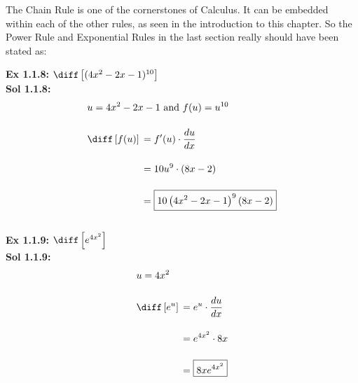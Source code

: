 The Chain Rule is one of the cornerstones of Calculus. It can be embedded within each of the other rules, as seen in the introduction to this chapter. So the Power Rule and Exponential Rules in the last section really should have been stated as: 


\textbf{Ex 1.1.8:} $\diff \left[(4x^2 - 2x - 1)^{10}\right]$ \\[11pt]
\textbf{Sol 1.1.8:} \begin{align*}
    & u = 4x^2 - 2x - 1 \text{ and } f(u) = u^{10} \\[11pt]
    & \diff \left[f(u)\right] \begin{aligned}[t]
        & = f'(u) \cdot \dfrac{du}{dx} \\[11pt] 
        & = 10u^9 \cdot \left(8x - 2\right) \\[11pt]
        & = \boxed{10\left(4x^2 - 2x - 1\right)^9(8x - 2)} \\[11pt]
    \end{aligned}
\end{align*}

\textbf{Ex 1.1.9:} $\diff \left[e^{4x^2}\right]$ \\[11pt]
\textbf{Sol 1.1.9:} \begin{align*}
    & u = 4x^2 \\[11pt]
    & \diff \left[e^u\right] \begin{aligned}[t]
        & = e^u \cdot \dfrac{du}{dx} \\[11pt]
        & = e^{4x^2} \cdot 8x \\[11pt]
        & = \boxed{8xe^{4x^2}}
    \end{aligned}
\end{align*}

